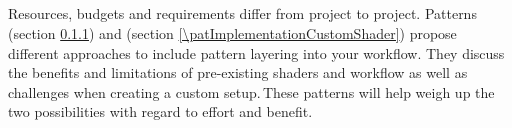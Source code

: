 \subsection{\patCatShaderImplementation}\label{\patCatShaderImplementation}

Resources, budgets and requirements differ from project to project. Patterns \emph{\patImplementationBUildtIn} (section \ref{\patImplementationBUildtIn}) and \emph{\patImplementationCustomShader} (section \ref{\patImplementationCustomShader}) propose different approaches to include pattern layering into your workflow. They discuss the benefits and limitations of pre-existing shaders and workflow as well as challenges when creating a custom setup.\,These patterns will help weigh up the two possibilities with regard to effort and benefit. 

\subsubsection{\patImplementationBUildtIn}\label{\patImplementationBUildtIn}
